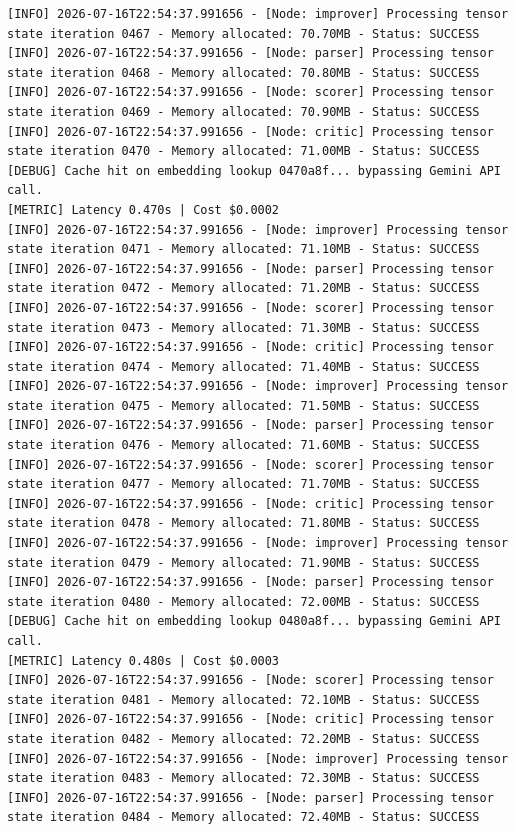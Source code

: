 \documentclass[10pt,journal,compsoc]{IEEEtran}
\begin{document}
\begin{verbatim}
[INFO] 2026-07-16T22:54:37.991656 - [Node: improver] Processing tensor state iteration 0467 - Memory allocated: 70.70MB - Status: SUCCESS
[INFO] 2026-07-16T22:54:37.991656 - [Node: parser] Processing tensor state iteration 0468 - Memory allocated: 70.80MB - Status: SUCCESS
[INFO] 2026-07-16T22:54:37.991656 - [Node: scorer] Processing tensor state iteration 0469 - Memory allocated: 70.90MB - Status: SUCCESS
[INFO] 2026-07-16T22:54:37.991656 - [Node: critic] Processing tensor state iteration 0470 - Memory allocated: 71.00MB - Status: SUCCESS
[DEBUG] Cache hit on embedding lookup 0470a8f... bypassing Gemini API call.
[METRIC] Latency 0.470s | Cost $0.0002
[INFO] 2026-07-16T22:54:37.991656 - [Node: improver] Processing tensor state iteration 0471 - Memory allocated: 71.10MB - Status: SUCCESS
[INFO] 2026-07-16T22:54:37.991656 - [Node: parser] Processing tensor state iteration 0472 - Memory allocated: 71.20MB - Status: SUCCESS
[INFO] 2026-07-16T22:54:37.991656 - [Node: scorer] Processing tensor state iteration 0473 - Memory allocated: 71.30MB - Status: SUCCESS
[INFO] 2026-07-16T22:54:37.991656 - [Node: critic] Processing tensor state iteration 0474 - Memory allocated: 71.40MB - Status: SUCCESS
[INFO] 2026-07-16T22:54:37.991656 - [Node: improver] Processing tensor state iteration 0475 - Memory allocated: 71.50MB - Status: SUCCESS
[INFO] 2026-07-16T22:54:37.991656 - [Node: parser] Processing tensor state iteration 0476 - Memory allocated: 71.60MB - Status: SUCCESS
[INFO] 2026-07-16T22:54:37.991656 - [Node: scorer] Processing tensor state iteration 0477 - Memory allocated: 71.70MB - Status: SUCCESS
[INFO] 2026-07-16T22:54:37.991656 - [Node: critic] Processing tensor state iteration 0478 - Memory allocated: 71.80MB - Status: SUCCESS
[INFO] 2026-07-16T22:54:37.991656 - [Node: improver] Processing tensor state iteration 0479 - Memory allocated: 71.90MB - Status: SUCCESS
[INFO] 2026-07-16T22:54:37.991656 - [Node: parser] Processing tensor state iteration 0480 - Memory allocated: 72.00MB - Status: SUCCESS
[DEBUG] Cache hit on embedding lookup 0480a8f... bypassing Gemini API call.
[METRIC] Latency 0.480s | Cost $0.0003
[INFO] 2026-07-16T22:54:37.991656 - [Node: scorer] Processing tensor state iteration 0481 - Memory allocated: 72.10MB - Status: SUCCESS
[INFO] 2026-07-16T22:54:37.991656 - [Node: critic] Processing tensor state iteration 0482 - Memory allocated: 72.20MB - Status: SUCCESS
[INFO] 2026-07-16T22:54:37.991656 - [Node: improver] Processing tensor state iteration 0483 - Memory allocated: 72.30MB - Status: SUCCESS
[INFO] 2026-07-16T22:54:37.991656 - [Node: parser] Processing tensor state iteration 0484 - Memory allocated: 72.40MB - Status: SUCCESS

\end{verbatim}
\end{document}
